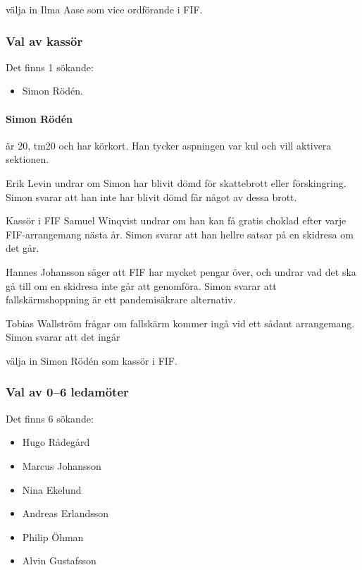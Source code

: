 \documentclass[hidelinks]{sektionsmote}
\begin{document}
\begin{beslut}
  \item välja in Ilma Aase som vice ordförande i FIF.
\end{beslut}


\subsubsection{Val av kassör}
Det finns 1 sökande:
\begin{itemize}
    \item Simon Rödén.
\end{itemize}

\paragraph{Simon Rödén} är 20, tm20 och har körkort.
Han tycker aspningen var kul och vill aktivera sektionen.

Erik Levin undrar om Simon har blivit dömd för skattebrott eller förskingring.
Simon svarar att han inte har blivit dömd får något av dessa brott.

Kassör i FIF Samuel Winqvist undrar om han kan få gratis choklad efter varje FIF-arrangemang nästa år.
Simon svarar att han hellre satsar på en skidresa om det går.

Hannes Johansson säger att FIF har mycket pengar över, och undrar vad det ska gå till om en skidresa inte går att genomföra.
Simon svarar att fallskärmshoppning är ett pandemisäkrare alternativ.

Tobias Wallström frågar om fallskärm kommer ingå vid ett sådant arrangemang.
Simon svarar att det ingår

\begin{beslut}
  \item välja in Simon Rödén som kassör i FIF.
\end{beslut}


\subsubsection{Val av 0--6 ledamöter}
Det finns 6 sökande:
\begin{itemize}
    \item Hugo Rådegård
    \item Marcus Johansson
    \item Nina Ekelund
    \item Andreas Erlandsson
    \item Philip Öhman
    \item Alvin Gustafsson
\end{itemize}
\end{document}
